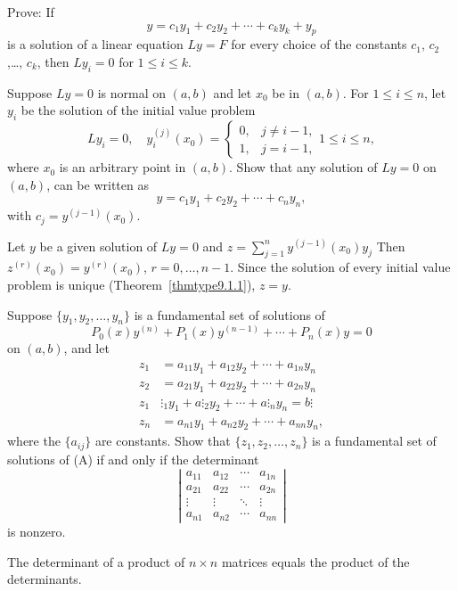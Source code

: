 \documentclass{ximera}
\begin{document}
\begin{problem}\label{exer:9.1.13}
Prove:  If
$$
y=c_1y_1+c_2y_2+\cdots+c_ky_k+y_p
$$
is a solution of a linear equation $Ly=F$ for every choice of the
constants $c_1$, $c_2$ ,\dots, $c_k$, then $Ly_i=0$ for $1\le i\le k$.
\end{problem}

\begin{problem}\label{exer:9.1.14}
Suppose $Ly=0$ is normal on $(a,b)$ and let $x_0$ be in $(a,b)$.
For $1\le i\le n$, let $y_i$ be the solution of the initial value
problem
$$
Ly_i=0, \quad  y_i^{(j)} (x_0)=
\left\{\begin{array}{cl}
0,& j\ne i-1,\\  
1,&j=i-1,\end{array}\right. 1\le i\le n,
$$
where $x_0$ is an arbitrary point in $(a,b)$.  Show that any solution
of $Ly=0$ on $(a, b)$, can be written as
$$
y=c_1y_1+c_2y_2+\cdots+c_ny_n,
$$
with $c_j=y^{(j-1)}(x_0)$.

\begin{solution}
Let $y$ be a given solution of $Ly=0$ and
$z=\sum_{j=1}^ny^{(j-1)}(x_0)y_j$ Then
$z^{(r)}(x_0)=y^{(r)}(x_0)$,
$r=0,\dots,n-1$. Since the solution of every initial value problem
is unique (Theorem~\ref{thmtype9.1.1}), $z=y$.
\end{solution}
\end{problem}

\begin{problem}\label{exer:9.1.15}
Suppose $\{y_1, y_2,\dots, y_n\}$ is a fundamental set of
solutions of
$$
P_0(x)y^{(n)}+P_1(x)y^{(n-1)}+\cdots+P_n(x)y=0
$$
on $(a,b)$, and let
$$
\begin{array}{rl}
z_1&=a_{11}y_1+a_{12}y_2+\cdots+a_{1n}y_n\\
z_2&=a_{21}y_1+a_{22}y_2+\cdots+a_{2n}y_n\\
 z_1&\vdots _1y_1+a\vdots
 _2y_2+\cdots+a\vdots _ny_n  =b\vdots\\
z_n&=a_{n1}y_1+a_{n2}y_2+\cdots+a_{nn}y_n,
\end{array}
$$
where the $\{a_{ij}\}$ are constants. Show that $\{z_1, z_2,\dots,
z_n\}$ is a fundamental set of solutions  of (A) if and only if the
determinant
$$
\left|\begin{array}{cccc}
a_{11}&a_{12}&\cdots&a_{1n}\\
a_{21}&a_{22}&\cdots&a_{2n}\\
\vdots&\vdots&\ddots&\vdots\\
a_{n1}&a_{n2}&\cdots&a_{nn}\end{array}\right|
$$
is nonzero.

\begin{hint}
The determinant of a product of  $n\times
n$ matrices equals the product of the determinants.
\end{hint}
\end{problem}
\end{document}
